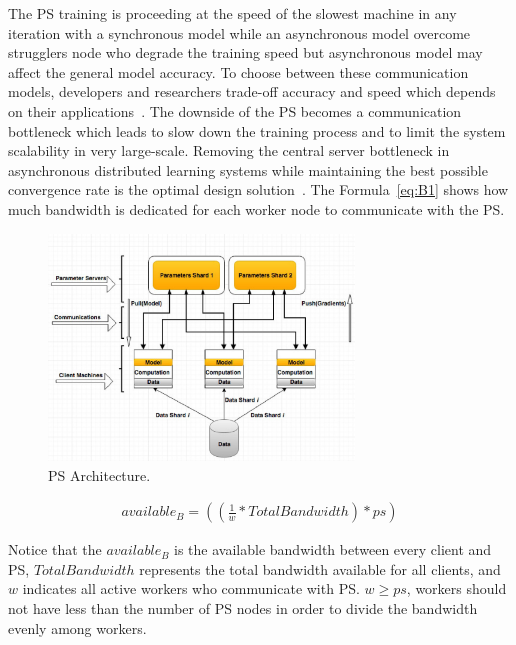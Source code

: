 \documentclass[conference]{IEEEtran}
\begin{document}

The PS training is proceeding at the speed of the slowest machine in any iteration with a synchronous model while an asynchronous model overcome strugglers node who degrade the training speed but  asynchronous model may affect the general model accuracy. To choose between these communication models, developers and researchers trade-off accuracy and speed which depends on their applications~\cite{cui2014exploiting}. The downside of the PS becomes a communication bottleneck which leads to slow down the training process and to limit the system scalability in very large-scale. Removing the central server bottleneck in asynchronous distributed learning systems while maintaining the best possible convergence rate is the optimal design solution~\cite{cui2014exploiting, cui2014big, cheung2002effect, ahmed2012scalable}. The Formula~\ref{eq:B1} shows how much bandwidth is dedicated for each worker node to communicate with the PS.

\begin{figure}[htb]
  \includegraphics[width=3.2in]{Fig/ps.jpg}
  \caption{PS Architecture.}
  \label{fig:ps}
\end{figure}

\begin{equation} \label{eq:B1}
\begin{split}
available_{B} =((\frac{1}{w} * {Total Bandwidth}) * ps )
\end{split}
\end{equation}

Notice that the $available_ {B}$ is the available bandwidth between every client and PS, $Total Bandwidth$ represents the total bandwidth available for all clients, and $w$ indicates all active workers who communicate with PS. $w\geq ps$, workers should not have less than the number of PS nodes in order to divide the bandwidth evenly among workers.
\end{document}
